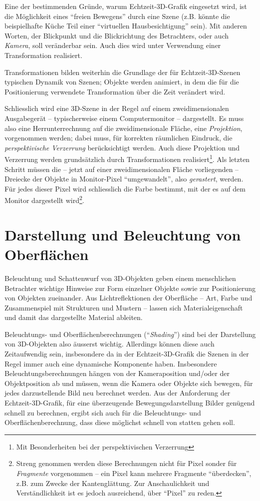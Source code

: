 \documentclass[twoside,a4paper,fleqn,12pt]{book}
\begin{document}
Eine der bestimmenden Gründe, warum Echtzeit-3D-Grafik eingesetzt wird, ist die Möglichkeit eines "`freien Bewegens"' durch
eine Szene (z.B. könnte die beispielhafte Küche Teil einer "`virtuellen Hausbesichtigung"' sein).
Mit anderen Worten, der Blickpunkt und die Blickrichtung des Betrachters, oder auch \emph{Kamera}, soll veränderbar sein.
Auch dies wird unter Verwendung einer Transformation realisiert.

Transformationen bilden weiterhin die Grundlage der für Echtzeit-3D-Szenen typischen Dynamik von Szenen; Objekte werden animiert,
in dem die für die Positionierung verwendete Transformation über die Zeit verändert wird.

Schliesslich wird eine 3D-Szene in der Regel auf einem zweidimensionalen Ausgabegerät -- typischerweise einem Computermonitor --
dargestellt. Es muss also eine Herrunterrechnung auf die zweidimensionale Fläche, eine \emph{Projektion}, vorgenommen werden;
dabei muss, für korrekten räumlichen Eindruck, die \emph{perspektivische Verzerrung} berücksichtigt werden.
Auch diese Projektion und Verzerrung werden grundsätzlich durch Transformationen realisiert\footnote{Mit Besonderheiten bei der perspektivischen Verzerrung}.
Als letzten Schritt müssen die -- jetzt auf einer zweidimensionalen Fläche vorliegenden -- Dreiecke der Objekte
in Monitor-Pixel "`umgewandelt"', also \emph{gerastert}, werden. Für jedes dieser Pixel wird schliesslich die Farbe bestimmt,
mit der es auf dem Monitor dargestellt wird\footnote{Streng genommen werden diese Berechnungen nicht für Pixel sonder für \emph{Fragmente} vorgenommen --
ein Pixel kann mehrere Fragmente "`überdecken"', z.B. zum Zwecke der Kantenglättung. Zur Anschaulichkeit und Verständlichkeit ist es jedoch
ausreichend, über "`Pixel"' zu reden.}.

\section{Darstellung und Beleuchtung von Oberflächen}
\label{surface_and_shading}

Beleuchtung und Schattenwurf von 3D-Objekten geben einem menschlichen Betrachter wichtige Hinweise zur Form
einzelner Objekte sowie zur Positionierung von Objekten zueinander. Aus Lichtreflektionen der Oberfläche -- Art, Farbe und Zusammenspiel
mit Strukturen und Mustern -- lassen sich Materialeigenschaft und damit das dargestellte Material ableiten.

Beleuchtungs- und Oberflächenberechnungen (``\emph{Shading}'') sind bei der Darstellung von 3D-Objekten also äusserst wichtig.
Allerdings können diese auch Zeitaufwendig sein, insbesondere da in der Echtzeit-3D-Grafik die Szenen in der Regel
immer auch eine dynamische Komponente haben. Insbesondere Beleuchtungsberechnungen hängen von der Kameraposition
und/oder der Objektposition ab und müssen, wenn die Kamera oder Objekte sich bewegen, für jedes darzustellende Bild
neu berechnet werden. Aus der Anforderung der Echtzeit-3D-Grafik, für eine überzeugende Bewegungsdarstellung
Bilder genügend schnell zu berechnen, ergibt sich auch für die Beleuchtungs- und Oberflächenberechnung, dass diese
möglichst schnell von statten gehen soll.
\end{document}
